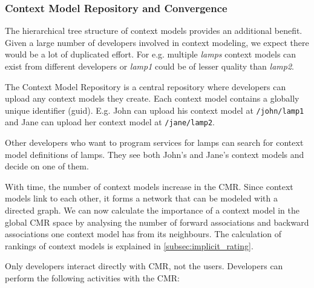 \subsubsection{Context Model Repository and Convergence}

The hierarchical tree structure of context models provides an additional benefit. Given a large number of developers involved in context modeling, we expect there would be a lot of duplicated effort. For e.g. multiple \emph{lamps} context models can exist from different developers or \emph{lamp1} could be of lesser quality than \emph{lamp2}.

The Context Model Repository is a central repository where developers can upload any context models they create. Each context model contains a globally unique identifier (guid). E.g. John can upload his context model at \texttt{/john/lamp1} and Jane can upload her context model at \texttt{/jane/lamp2}.

Other developers who want to program services for lamps can search for context model definitions of lamps. They see both John's and Jane's context models and decide on one of them.

With time, the number of context models increase in the CMR. Since context models link to each other, it forms a network that can be modeled with a directed graph. We can now calculate the importance of a context model in the global CMR space by analysing the number of forward associations and backward associations one context model has from its neighbours. The calculation of rankings of context models is explained in \ref{subsec:implicit_rating}.

Only developers interact directly with CMR, not the users. Developers can perform the following activities with the CMR:

